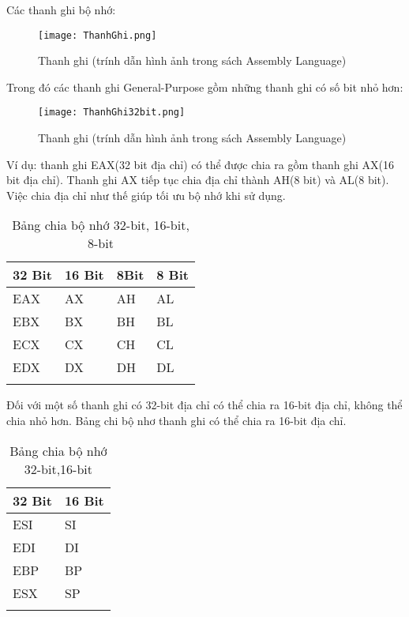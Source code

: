 		Các thanh ghi bộ nhớ:		
		\begin{center}
			\begin{figure}[htp]
				\begin{center}
					\texttt{[image: ThanhGhi.png]}
				\end{center}
				\caption{Thanh ghi (trính dẫn hình ảnh trong sách Assembly Language)}
				\label{fig:Flow}
			\end{figure}
		\end{center}
		
		Trong đó các thanh ghi General-Purpose gồm những thanh ghi có số bit nhỏ hơn:	
		\begin{center}
			\begin{figure}[htp]
				\begin{center}
					\texttt{[image: ThanhGhi32bit.png]}
				\end{center}
				\caption{Thanh ghi (trính dẫn hình ảnh trong sách Assembly Language)}
				\label{fig:Flow}
			\end{figure}
		\end{center}
		
		Ví dụ: thanh ghi EAX(32 bit địa chỉ) có thể được chia ra gồm thanh ghi AX(16 bit địa chỉ). Thanh ghi AX tiếp tục chia địa chỉ thành AH(8 bit) và AL(8 bit). Việc chia địa chỉ như thế giúp tối ưu bộ nhớ khi sử dụng.\\
		\begin{longtable}{ | m{3cm} | m{3cm} | m{3cm}  | m{3cm}| }
			\hline
				32 Bit & 16 Bit & 8Bit & 8 Bit\\
			\hline
			\hline
				EAX & AX	& AH	 & AL\\
			\hline			
				EBX & BX	& BH	 & BL\\
			\hline		
				ECX & CX	& CH	 & CL\\		
			\hline
				EDX & DX	& DH	 & DL\\
			\hline
			\caption{Bảng chia bộ nhớ 32-bit, 16-bit, 8-bit}
			\label{table:tbthanhghi}
		\end{longtable}
		
			Đối với một số thanh ghi có 32-bit địa chỉ có thể chia ra 16-bit địa chỉ, không thể chia nhỏ hơn. Bảng chi bộ nhơ thanh ghi có thể chia ra 16-bit địa chỉ.\\
			\begin{longtable}{ | m{3cm} | m{3cm} | }
			\hline
				32 Bit & 16 Bit\\
			\hline
			\hline
				ESI & SI\\
			\hline			
				EDI & DI\\
			\hline		
				EBP & BP\\		
			\hline
				ESX & SP\\
			\hline
			\caption{Bảng chia bộ nhớ 32-bit,16-bit}
			\label{table:tbthanhghi}
		\end{longtable}
		
